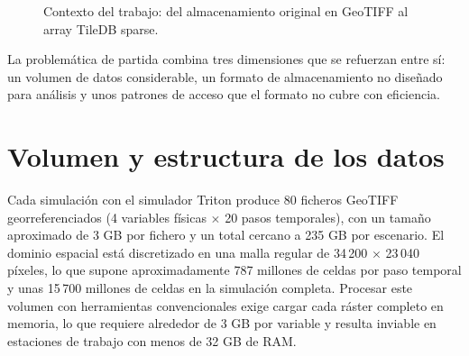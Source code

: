 \begin{figure}[ht]
\caption{Contexto del trabajo: del almacenamiento original en GeoTIFF al array TileDB sparse.}
\label{fig:contexto-problema}
\end{figure}
\FloatBarrier

La problemática de partida combina tres dimensiones que se refuerzan entre sí: un volumen de datos considerable, un formato de almacenamiento no diseñado para análisis y unos patrones de acceso que el formato no cubre con eficiencia.

\section{Volumen y estructura de los datos}\label{volumen-y-estructura}

Cada simulación con el simulador Triton produce 80 ficheros GeoTIFF georreferenciados (4 variables físicas $\times$ 20 pasos temporales), con un tamaño aproximado de 3 GB por fichero y un total cercano a 235 GB por escenario. El dominio espacial está discretizado en una malla regular de 34\,200 $\times$ 23\,040 píxeles, lo que supone aproximadamente 787 millones de celdas por paso temporal y unas 15\,700 millones de celdas en la simulación completa. Procesar este volumen con herramientas convencionales exige cargar cada ráster completo en memoria, lo que requiere alrededor de 3 GB por variable y resulta inviable en estaciones de trabajo con menos de 32 GB de RAM.

